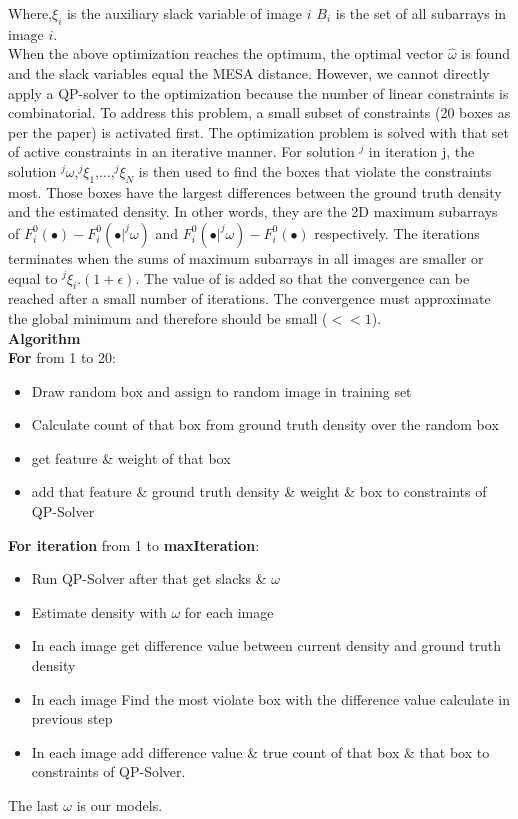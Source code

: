 Where,$\xi_i$ is the auxiliary slack variable of image $i$
$B_i$ is the set of all subarrays in image $i$.\\
When the above optimization reaches the optimum, the optimal vector $\hat{\omega}$ is found and the slack variables equal the MESA distance. However, we cannot directly apply a QP-solver to the optimization because the number of linear constraints is combinatorial. To address this problem, a small subset of constraints (20 boxes as per the paper) is activated first. The optimization problem is solved with that set of active constraints in an iterative manner. For solution $^j$ in iteration j, the solution $^{j}\omega$,$^{j}\xi_1$,...,$^{j}\xi_N$ is then used to find the boxes that violate the constraints most. Those boxes have the largest differences between the ground truth density and the estimated density. In other words, they are the 2D maximum subarrays of $F^{0}_{i}(\bullet) - F^{0}_{i}(\bullet|^{j}\omega)$ and $F^{0}_{i}(\bullet|^{j}\omega) - F^{0}_{i}(\bullet)$ respectively. The iterations terminates when the sums of maximum subarrays in all images are smaller or equal to $^{j}\xi_{i}.(1+ \epsilon)$. The value of is added so that the convergence can be reached after a small number of iterations. The convergence must approximate the global minimum and therefore should be small ($<<1$).\\
\textbf{Algorithm}\\
\textbf{For} from 1 to 20:
    \begin{itemize}
        \item Draw random box and assign to random image in training set 
        \item Calculate count of that box from ground truth density over the random box 
        \item get feature \& weight of that box
        \item add that feature \& ground truth density \& weight \& box to constraints of QP-Solver
    \end{itemize}
\textbf{For iteration} from 1 to \textbf{maxIteration}:
    \begin{itemize}
        \item Run QP-Solver after that get slacks \& $\omega$
        \item Estimate density with $\omega$ for each image
        \item In each image get difference value between current density and ground truth density 
        \item In each image Find the most violate box with the difference value calculate in previous step
        \item In each image add difference value \& true count of that box \& that box to constraints of QP-Solver.
    \end{itemize}

The last $\omega$ is our models.
